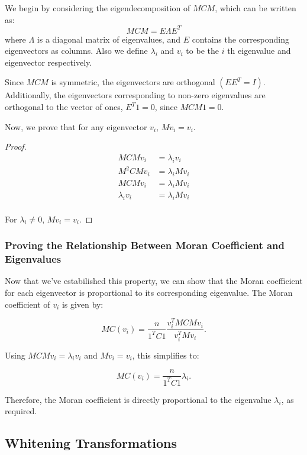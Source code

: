 \documentclass[12pt]{article}
\begin{document}
We begin by considering the eigendecomposition of \( M C M \), which can be written as:
\[
  M C M = E \Lambda E^{T}
\]
where \( \Lambda \) is a diagonal matrix of eigenvalues, and \( E \) contains the corresponding eigenvectors as columns. Also we define \( \lambda_i \) and \( v_i \) to be the \( i \) th eigenvalue and eigenvector respectively.

Since \( M C M \) is symmetric, the eigenvectors are orthogonal \( \left(E E^T = I \right) \). Additionally, the eigenvectors corresponding to non-zero eigenvalues are orthogonal to the vector of ones, \( E^T 1 = 0 \), since \( M C M 1 = 0 \).

Now, we prove that for any eigenvector \( v_i \), \( M v_i = v_i \).

\begin{proof}
  \begin{align*}
    M C M v_i & = \lambda_i v_i \\
    M^2 C M v_i & = \lambda_i M v_i \\
    M C M v_i & = \lambda_i M v_i \\
    \lambda_i v_i & = \lambda_i M v_i \\
  \end{align*}

  For \( \lambda_i \neq 0 \), \( M v_i = v_i \).
\end{proof}

\subsubsection*{Proving the Relationship Between Moran Coefficient and Eigenvalues}

Now that we've estabilished this property, we can show that the Moran coefficient for each eigenvector is proportional to its corresponding eigenvalue. The Moran coefficient of \( v_i \) is given by:

\[
  M C (v_i)=\frac{n}{1^T C 1} \frac{v_i^T M C M v_i}{v_i^T M v_i} .
\]

Using \( M C M v_i = \lambda_i v_i \) and \( M v_i = v_i \), this simplifies to:

\[
  M C (v_i)=\frac{n}{1^T C 1} \lambda_i.
\]

Therefore, the Moran coefficient is directly proportional to the eigenvalue \( \lambda_i \), as required.

\subsection*{Whitening Transformations}
\end{document}

